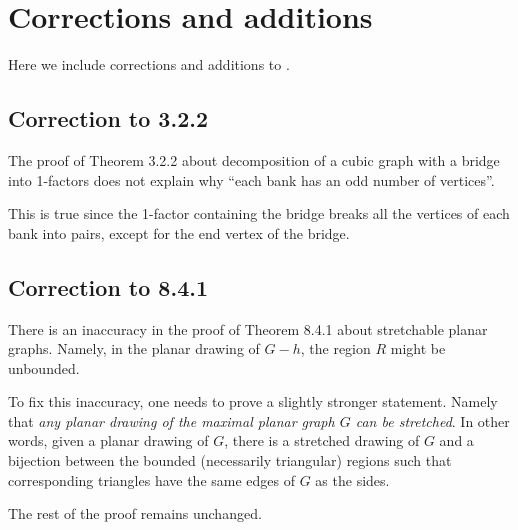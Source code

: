 \setcounter{eqtn}{0}
\chapter*{Corrections and additions}

Here we include corrections and additions to \cite{hartsfield-ringel}.

\section{Correction to 3.2.2}

The proof of Theorem 3.2.2 about decomposition of a cubic graph with a bridge into 1-factors
does not explain why ``each bank has an odd number of vertices''.

This is true since the 1-factor containing the bridge breaks all the vertices of each bank into pairs, except for the end vertex of the bridge.


\section{Correction to 8.4.1}

There is an inaccuracy in the proof of Theorem 8.4.1 about stretchable planar graphs.
Namely, in the planar drawing of $G-h$, the region $R$ might be unbounded.

To fix this inaccuracy, one needs to prove a slightly stronger statement.
Namely that \textit{any planar drawing of the maximal planar graph $G$ can be stretched}.
In other words, given a planar drawing of $G$, there is a stretched drawing of $G$ 
and a bijection between the bounded (necessarily triangular) regions such that corresponding triangles have the same edges of $G$ as the sides.

The rest of the proof remains unchanged.

